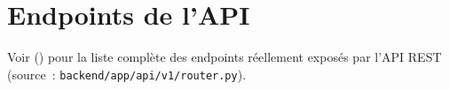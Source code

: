 \chapter{Endpoints de l'API}
\label{annex:api}

Voir  () pour la liste compl\`ete des endpoints r\'eellement expos\'es par l'API REST (source~: \texttt{backend/app/api/v1/router.py}).
